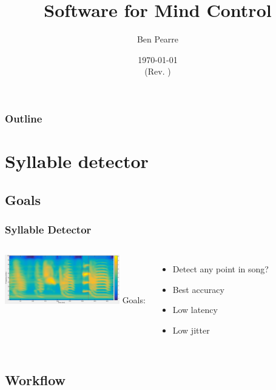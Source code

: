 \documentclass{beamer}
\title{Software for Mind Control}
\author{Ben Pearre}
\date{\today\\{\small (Rev. \svnrev)}}
\begin{document}
\begin{frame}
  \titlepage
\end{frame}

\begin{frame}
  \frametitle{Outline}
  \tableofcontents
\end{frame}



\section{Syllable detector}
\subsection{Goals}

\begin{frame}
  \frametitle{Syllable Detector}
  \begin{columns}
    \column{5cm}
    \includegraphics[width=5cm]{song-spectrogram-with-alignment-1}
    \column{50mm}
    Goals:
    \begin{itemize}
    \item Detect any point in song?
    \item Best accuracy
    \item Low latency
    \item Low jitter
    \end{itemize}
  \end{columns}
\end{frame}

\subsection{Workflow}
\end{document}
